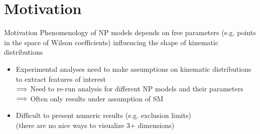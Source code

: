 \section{Motivation}
\begin{frame}{Motivation}
	Phenomenology of NP models depends on free parameters (e.g. points in the space of Wilson coefficients) influencing the shape of kinematic distributions
	
	\bigskip
	\begin{itemize}
		\item Experimental analyses need to make assumptions on kinematic distributions to extract features of interest\\
		$\Longrightarrow$ Need to re-run analysis for different NP models and their parameters\\
		$\Longrightarrow$ Often only results under assumption of SM 
		\item Difficult to present numeric results (e.g. exclusion limits)\\
		{\footnotesize (there are no nice ways to visualize 3+ dimensions)}\\
	\end{itemize}
\end{frame}
%
